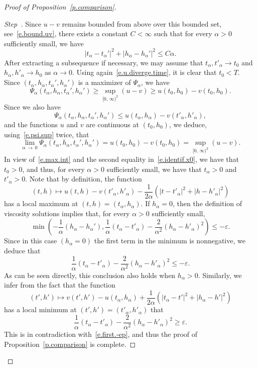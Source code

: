 \documentclass[10pt]{amsart}
\theoremstyle{definition}\newtheorem{defi}[theo]{Definition}\newtheorem{rema}[theo]{Remark}\newtheorem{exam}[theo]{Example}\newtheorem{exem}[theo]{Example}\newtheorem{nota}[theo]{Notation}
\newcommand{\1}{\mathds{1}}
\newcommand{\ep}{\varepsilon}
\renewcommand{\le}{\leqslant}
\renewcommand{\ge}{\geqslant}
\newcommand{\al}{\alpha}
\newcounter{stepcount}
\newenvironment{step}{\refstepcounter{stepcount}\begin{proof}[Step~\thestepcount]}{\let\qed\relax\end{proof}}
\begin{document}
\begin{proof}[Proof of Proposition~\ref{p.comparison}]
\begin{step}

Since $u - v$ remains bounded from above over this bounded set, see~\eqref{e.bound.uv}, there exists a constant $C < \infty$ such that for every $\al > 0$ sufficiently small, we have
\[
\left|t_\al-t_\al'\right|^2 + \left|h_\al-h_\al'\right|^2 \le C \al.
\]
After extracting a subsequence if necessary, we may assume that $t_\alpha,t'_\alpha \to t_0$ and $h_\al,h'_\al \to h_0$ as $\alpha \to 0$. Using again~\eqref{e.u.diverge.time}, it is clear that $t_0 < T$. Since $(t_\al,h_\al,t_\al',h_\al')$ is a maximizer of $\Psi_\al$, we have
\begin{equation}\label{e.psi.sup}
\Psi_\al\left(t_\al,h_\al,t_\al',h_\al'\right) \ge \sup_{[0,\,\infty)^2} (u-v) \ge u(t_0,h_0) - v(t_0,h_0).
\end{equation}
Since we also have
\[
\Psi_\alpha\left(t_\al,h_\al,t_\al',h_\al'\right) \le u\left(t_\alpha,h_\al\right) - v\left(t'_\al,h'_\alpha\right),
\]
and the functions $u$ and $v$ are continuous at $(t_0,h_0)$, we deduce, using~\eqref{e.psi.sup} twice, that
\begin{equation}\label{e.identif.x0}
\lim_{\al\,\to\,0} \Psi_{\alpha}\left(t_\al,h_\al,t_\al',h_\al'\right) = u(t_0,h_0) - v(t_0,h_0) = \sup_{[0,\,\infty)^2} (u-v).
\end{equation}
In view of~\eqref{e.max.int} and the second equality in~\eqref{e.identif.x0}, we have that $t_0 > 0$, and thus, for every $\al > 0$ sufficiently small, we have that $t_\al > 0$ and $t'_\al > 0$. Note that by definition, the function
\[
(t,h) \mapsto u(t,h) - v\left(t'_\al,h'_\al\right) - \frac 1 {2\al} \left(\left|t-t'_\al\right|^2 + \left|h-h'_\al\right|^2 \right)
\]
has a local maximum at $(t,h) = (t_\al,h_\al)$. If $h_\al = 0$, then the definition of viscosity solutions implies that, for every $\alpha > 0$ sufficiently small,
\[
\min \left(-\frac 1 \alpha \left(h_\al - h_\al'\right), \frac{1}{\al} \left(t_\al - t'_\al\right) - \frac{2}{\al^2} \left(h_\al - h'_\al\right)^2 \right)\le -\ep.
\]
Since in this case $(h_\al = 0)$ the first term in the minimum is nonnegative, we deduce that
\begin{equation}\label{e.first.-ep}
\frac{1}{\al} \left(t_\al - t'_\al\right) - \frac{2}{\al^2} \left(h_\al - h'_\al\right)^2\le -\ep.
\end{equation}
As can be seen directly, this conclusion also holds when $h_\al > 0$. Similarly, we infer from the fact that the function
\[
\left(t',h'\right) \mapsto v\left(t',h'\right) - u\left(t_\al,h_\al\right) + \frac 1 {2\al}\left(\left|t_\al-t'\right|^2 + \left|h_\al-h'\right|^2 \right)
\]
has a local minimum at $(t',h') = (t'_\al,h'_\al)$ that
\[
\frac{1}{\al} \left(t_\al - t'_\al\right) - \frac{2}{\al^2} \left(h_\al - h'_\al\right)^2 \ge \ep.
\]
This is in contradiction with~\eqref{e.first.-ep}, and thus the proof of Proposition~\ref{p.comparison} is com\-plete.\qedhere
\end{step}\let\qed\relax
\end{proof}
\end{document}
